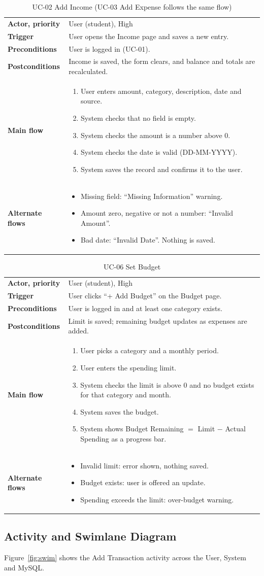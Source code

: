 \documentclass[12pt,a4paper]{article}
\makeatletter
\newcommand{\usecase}[7]{%
  \begin{table}[H]
  \centering
  \caption{#1}
  \begin{tabularx}{\textwidth}{@{}>{\bfseries}p{3.2cm}X@{}}
    \toprule
    Actor, priority & #2 \\
    Trigger & #3 \\
    Preconditions & #4 \\
    Postconditions & #5 \\
    \midrule
    Main flow & \begin{enumerate}[label=\arabic*.]#6\end{enumerate} \\
    \midrule
    Alternate flows & \begin{itemize}#7\end{itemize} \\
    \bottomrule
  \end{tabularx}
  \end{table}}
\makeatother
\begin{document}
\usecase{UC-02 Add Income (UC-03 Add Expense follows the same flow)}
  {User (student), High}
  {User opens the Income page and saves a new entry.}
  {User is logged in (UC-01).}
  {Income is saved, the form clears, and balance and totals are recalculated.}
  {\item User enters amount, category, description, date and source.
   \item System checks that no field is empty.
   \item System checks the amount is a number above 0.
   \item System checks the date is valid (DD-MM-YYYY).
   \item System saves the record and confirms it to the user.}
  {\item Missing field: ``Missing Information'' warning.
   \item Amount zero, negative or not a number: ``Invalid Amount''.
   \item Bad date: ``Invalid Date''. Nothing is saved.}

\usecase{UC-06 Set Budget}
  {User (student), High}
  {User clicks ``+ Add Budget'' on the Budget page.}
  {User is logged in and at least one category exists.}
  {Limit is saved; remaining budget updates as expenses are added.}
  {\item User picks a category and a monthly period.
   \item User enters the spending limit.
   \item System checks the limit is above 0 and no budget exists for that category and month.
   \item System saves the budget.
   \item System shows Budget Remaining $=$ Limit $-$ Actual Spending as a progress bar.}
  {\item Invalid limit: error shown, nothing saved.
   \item Budget exists: user is offered an update.
   \item Spending exceeds the limit: over-budget warning.}

\subsection{Activity and Swimlane Diagram}
Figure~\ref{fig:swim} shows the Add Transaction activity across the User, System and MySQL.
\end{document}
